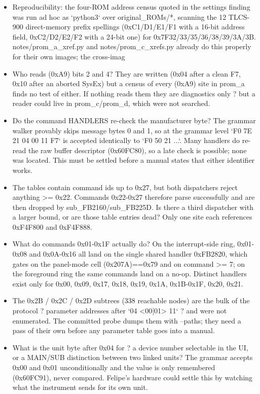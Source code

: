 \begin{itemize}
\item Reproducibility: the four-ROM address census quoted in the settings finding was run ad hoc as `python3` over original\_ROMs/*, scanning the 12 TLCS-900 direct-memory prefix spellings (0xC1/D1/E1/F1 with a 16-bit address field, 0xC2/D2/E2/F2 with a 24-bit one) for 0x7F32/33/35/36/38/39/3A/3B. notes/prom\_a\_xref.py and notes/prom\_c\_xrefs.py already do this properly for their own images; the cross-imag
\item Who reads (0xA9) bits 2 and 4? They are written (0x04 after a clean F7, 0x10 after an aborted SysEx) but a census of every (0xA9) site in prom\_a finds no test of either. If nothing reads them they are diagnostics only ? but a reader could live in prom\_c/prom\_d, which were not searched.
\item Do the command HANDLERS re-check the manufacturer byte? The grammar walker provably skips message bytes 0 and 1, so at the grammar level `F0 7E 21 04 00 11 F7` is accepted identically to `F0 50 21 ...`. Many handlers do re-read the raw buffer descriptor (0x60FC80), so a late check is possible; none was located. This must be settled before a manual states that either identifier works.
\item The tables contain command ids up to 0x27, but both dispatchers reject anything >= 0x22. Commands 0x22-0x27 therefore parse successfully and are then dropped by sub\_FB2160/sub\_FB225D. Is there a third dispatcher with a larger bound, or are those table entries dead? Only one site each references 0xF4F800 and 0xF4F888.
\item What do commands 0x01-0x1F actually do? On the interrupt-side ring, 0x01-0x08 and 0x0A-0x16 all land on the single shared handler 0xFB2820, which gates on the panel-mode cell (0x207A)==0x79 and on command >= 7; on the foreground ring the same commands land on a no-op. Distinct handlers exist only for 0x00, 0x09, 0x17, 0x18, 0x19, 0x1A, 0x1B-0x1F, 0x20, 0x21.
\item The 0x2B / 0x2C / 0x2D subtrees (338 reachable nodes) are the bulk of the protocol ? parameter addresses after `04 <00|01> 11` ? and were not enumerated. The committed probe dumps them with --paths; they need a pass of their own before any parameter table goes into a manual.
\item What is the unit byte after 0x04 for ? a device number selectable in the UI, or a MAIN/SUB distinction between two linked units? The grammar accepts 0x00 and 0x01 unconditionally and the value is only remembered (0x60FC91), never compared. Felipe's hardware could settle this by watching what the instrument sends for its own unit.

\end{itemize}

